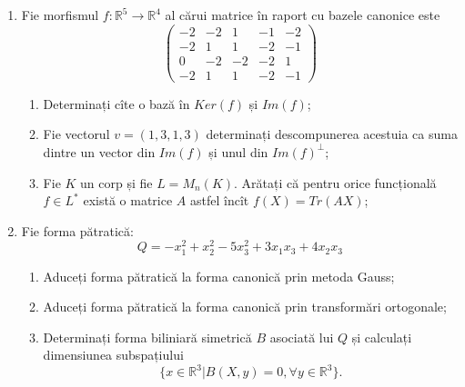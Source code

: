 \documentclass{article}
\begin{document}
\begin{enumerate}
 \item Fie morfismul $f:\mathbb{R}^5 \to \mathbb{R}^4$ al cărui matrice în raport cu bazele canonice este
$$\begin{pmatrix}
-2&-2&1&-1&-2\\
-2&1&1&-2&-1\\
0&-2&-2&-2&1\\
-2&1&1&-2&-1
\end{pmatrix}$$

\begin{enumerate}
\item Determinați cîte o bază în $Ker(f)$ și $Im(f)$;
\item Fie vectorul $v=(1,3,1,3)$ determinați descompunerea acestuia ca suma dintre un vector din $Im(f)$ și unul din $Im(f)^\perp$;
\item Fie $K$ un corp și fie $L=M_n(K)$. Arătați că pentru orice funcțională $f \in L^*$ există o matrice $A$ astfel încît $f(X)=Tr(AX)$;
\end{enumerate}
\item Fie forma pătratică:
$$Q= -x_1^2+x_2^2-5x_3^2+3x_1x_3+4x_2x_3$$

\begin{enumerate}
\item Aduceți forma pătratică la forma canonică prin metoda Gauss;
\item Aduceți forma pătratică la forma canonică prin transformări ortogonale;
\item Determinați forma biliniară simetrică $B$ asociată lui $Q$ și calculați dimensiunea subspațiului
$$\{x \in \mathbb{R}^3 | B(X,y)=0,\forall y \in \mathbb{R}^3\}.$$

\end{enumerate}
\end{enumerate}
\newpage
\end{document}
